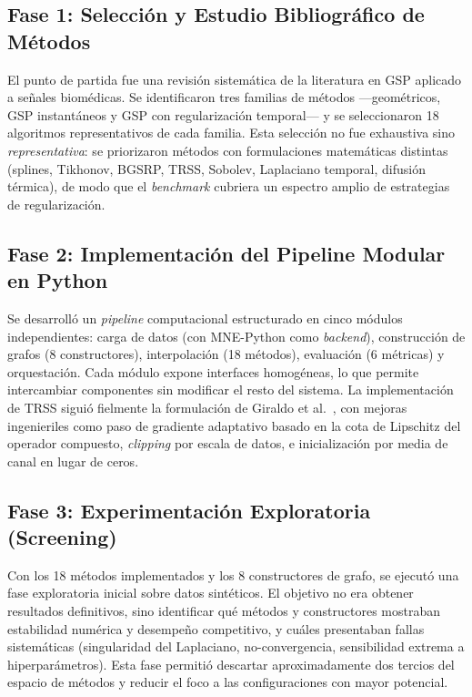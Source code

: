 \subsection{Fase 1: Selección y Estudio Bibliográfico de Métodos}

El punto de partida fue una revisión sistemática de la literatura en GSP aplicado a señales biomédicas. Se identificaron tres familias de métodos —geométricos, GSP instantáneos y GSP con regularización temporal— y se seleccionaron 18 algoritmos representativos de cada familia. Esta selección no fue exhaustiva sino \textit{representativa}: se priorizaron métodos con formulaciones matemáticas distintas (splines, Tikhonov, BGSRP, TRSS, Sobolev, Laplaciano temporal, difusión térmica), de modo que el \textit{benchmark} cubriera un espectro amplio de estrategias de regularización.

\subsection{Fase 2: Implementación del Pipeline Modular en Python}

Se desarrolló un \textit{pipeline} computacional estructurado en cinco módulos independientes: carga de datos (con MNE-Python como \textit{backend}), construcción de grafos (8 constructores), interpolación (18 métodos), evaluación (6 métricas) y orquestación. Cada módulo expone interfaces homogéneas, lo que permite intercambiar componentes sin modificar el resto del sistema. La implementación de TRSS siguió fielmente la formulación de Giraldo et al.~\cite{giraldo2022}, con mejoras ingenieriles como paso de gradiente adaptativo basado en la cota de Lipschitz del operador compuesto, \textit{clipping} por escala de datos, e inicialización por media de canal en lugar de ceros.

\subsection{Fase 3: Experimentación Exploratoria (Screening)}

Con los 18 métodos implementados y los 8 constructores de grafo, se ejecutó una fase exploratoria inicial sobre datos sintéticos. El objetivo no era obtener resultados definitivos, sino identificar qué métodos y constructores mostraban estabilidad numérica y desempeño competitivo, y cuáles presentaban fallas sistemáticas (singularidad del Laplaciano, no-convergencia, sensibilidad extrema a hiperparámetros). Esta fase permitió descartar aproximadamente dos tercios del espacio de métodos y reducir el foco a las configuraciones con mayor potencial.

